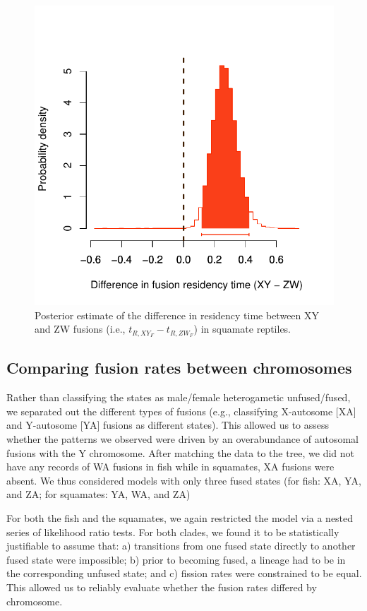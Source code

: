 \documentclass[12pt,twoside]{article}
\begin{document}
\begin{figure}[p]
\centering
\includegraphics[scale=1.1]{figs/karyotype-residency-squa-6par}
\caption{Posterior estimate of the difference in residency time between XY and ZW fusions (i.e., $t_{R,XY_F} - t_{R,ZW_F}$) in squamate reptiles.}
\label{fig:squa-resid}
\end{figure}


\subsection{Comparing fusion rates between chromosomes} 

Rather than classifying the states as male/female heterogametic unfused/fused, we separated out the different types of fusions (e.g., classifying X-autosome [XA] and Y-autosome [YA] fusions as different states). This allowed us to assess whether the patterns we observed were driven by an overabundance of autosomal fusions with the Y chromosome. After matching the data to the tree, we did not have any records of WA fusions in fish while in squamates, XA fusions were absent. We thus considered models with only three fused states (for fish: XA, YA, and ZA; for squamates: YA, WA, and ZA)

For both the fish and the squamates, we again restricted the model via a nested series of likelihood ratio tests. For both clades, we found it to be statistically justifiable to assume that: a) transitions from one fused state directly to another fused state were impossible; b) prior to becoming fused, a lineage had to be in the corresponding unfused state; and c) fission rates were constrained to be equal. This allowed us to reliably evaluate whether the fusion rates differed by chromosome.
\end{document}
